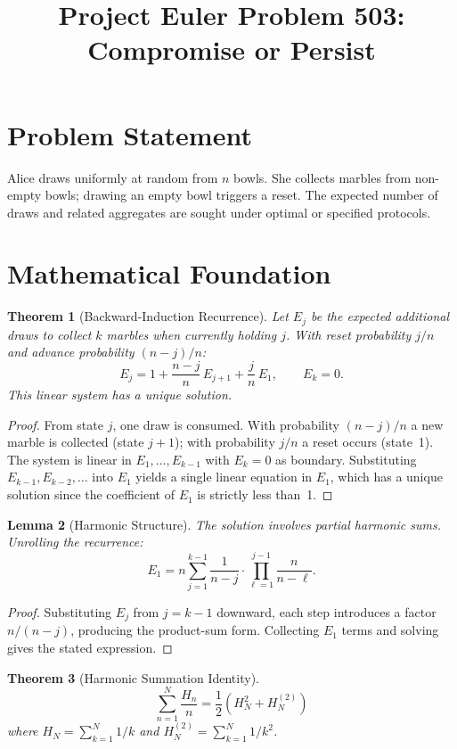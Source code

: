 \documentclass[12pt]{article}
\title{Project Euler Problem 503: Compromise or Persist}
\author{}
\date{}
\newtheorem{theorem}{Theorem}
\newtheorem{lemma}[theorem]{Lemma}
\begin{document}
\maketitle

\section{Problem Statement}
Alice draws uniformly at random from $n$ bowls. She collects marbles from non-empty bowls; drawing an empty bowl triggers a reset. The expected number of draws and related aggregates are sought under optimal or specified protocols.

\section{Mathematical Foundation}

\begin{theorem}[Backward-Induction Recurrence]
Let $E_j$ be the expected additional draws to collect $k$ marbles when currently holding $j$. With reset probability $j/n$ and advance probability $(n-j)/n$:
\[
E_j = 1 + \frac{n-j}{n}\,E_{j+1} + \frac{j}{n}\,E_1, \qquad E_k = 0.
\]
This linear system has a unique solution.
\end{theorem}

\begin{proof}
From state $j$, one draw is consumed. With probability $(n-j)/n$ a new marble is collected (state $j+1$); with probability $j/n$ a reset occurs (state~1). The system is linear in $E_1, \ldots, E_{k-1}$ with $E_k = 0$ as boundary. Substituting $E_{k-1}, E_{k-2}, \ldots$ into $E_1$ yields a single linear equation in $E_1$, which has a unique solution since the coefficient of $E_1$ is strictly less than~1.
\end{proof}

\begin{lemma}[Harmonic Structure]
The solution involves partial harmonic sums. Unrolling the recurrence:
\[
E_1 = n \sum_{j=1}^{k-1} \frac{1}{n-j} \cdot \prod_{\ell=1}^{j-1} \frac{n}{n - \ell}.
\]
\end{lemma}

\begin{proof}
Substituting $E_j$ from $j = k-1$ downward, each step introduces a factor $n/(n-j)$, producing the product-sum form. Collecting $E_1$ terms and solving gives the stated expression.
\end{proof}

\begin{theorem}[Harmonic Summation Identity]
\[
\sum_{n=1}^{N} \frac{H_n}{n} = \frac{1}{2}\left(H_N^2 + H_N^{(2)}\right)
\]
where $H_N = \sum_{k=1}^{N} 1/k$ and $H_N^{(2)} = \sum_{k=1}^{N} 1/k^2$.
\end{theorem}
\end{document}
